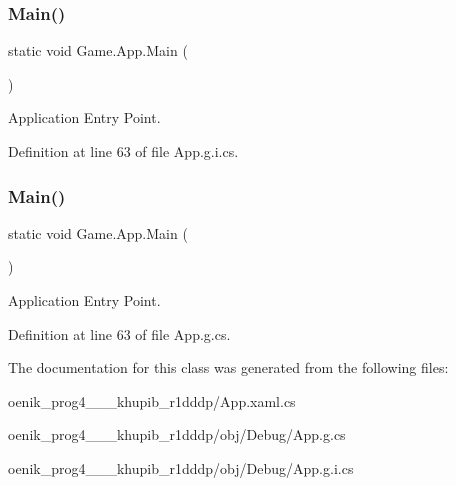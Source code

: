 \subsubsection{\texorpdfstring{Main()}{Main()}\hspace{0.1cm}{\footnotesize\ttfamily [1/2]}}
{\footnotesize\ttfamily static void Game.\+App.\+Main (\begin{DoxyParamCaption}{ }\end{DoxyParamCaption})\hspace{0.3cm}{\ttfamily [static]}}



Application Entry Point. 



Definition at line 63 of file App.\+g.\+i.\+cs.

\mbox{\label{class_game_1_1_app_a853ce541182011b521a2e83950ab26b9}} 
\subsubsection{\texorpdfstring{Main()}{Main()}\hspace{0.1cm}{\footnotesize\ttfamily [2/2]}}
{\footnotesize\ttfamily static void Game.\+App.\+Main (\begin{DoxyParamCaption}{ }\end{DoxyParamCaption})\hspace{0.3cm}{\ttfamily [static]}}



Application Entry Point. 



Definition at line 63 of file App.\+g.\+cs.



The documentation for this class was generated from the following files\+:\begin{DoxyCompactItemize}
\item 
oenik\+\_\+prog4\+\_\+\_\+\_\+khupib\+\_\+r1dddp/App.\+xaml.\+cs\item 
oenik\+\_\+prog4\+\_\+\_\+\_\+khupib\+\_\+r1dddp/obj/\+Debug/App.\+g.\+cs\item 
oenik\+\_\+prog4\+\_\+\_\+\_\+khupib\+\_\+r1dddp/obj/\+Debug/App.\+g.\+i.\+cs\end{DoxyCompactItemize}
